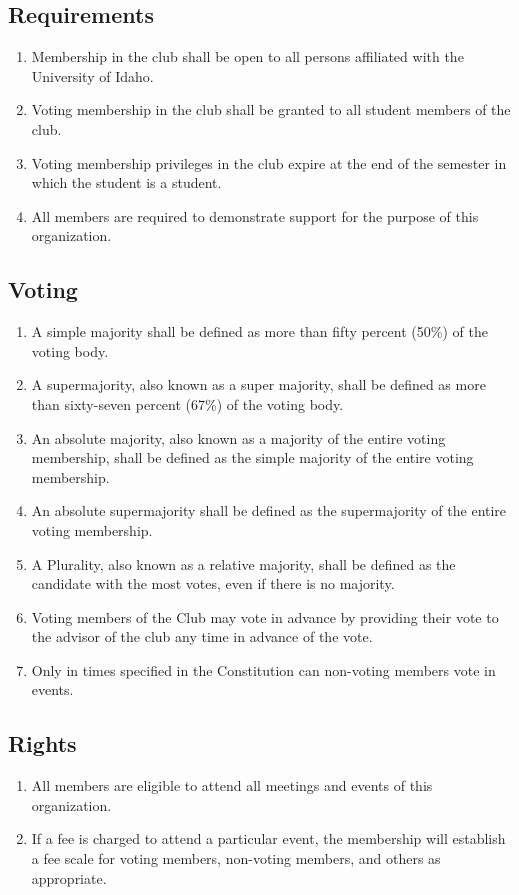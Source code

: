\documentclass[12pt]{scrartcl} %
\begin{document}
	\subsection{Requirements}
		\begin{enumerate}
			\item Membership in the club shall be open to all persons affiliated with the University of Idaho. 
			\item Voting membership in the club shall be granted to all student members of the club.
			\item Voting membership privileges in the club expire at the end of the semester in which the student is a student.  
			\item All members are required to demonstrate support for the purpose of this organization.
		\end{enumerate}
	\subsection{Voting}
		\begin{enumerate}
			\item A simple majority shall be defined as more than fifty percent (50\%) of the voting body.
			\item A supermajority, also known as a super majority, shall be defined as more than sixty-seven percent (67\%) of the voting body.
			\item An absolute majority, also known as a majority of the entire voting membership, shall be defined as the simple majority of the entire voting membership.
			\item An absolute supermajority shall be defined as the supermajority of the entire voting membership.
			\item A Plurality, also known as a relative majority, shall be defined as the candidate with the most votes, even if there is no majority.
			\item Voting members of the Club may vote in advance by providing their vote to the advisor of the club any time in advance of the vote.
			\item Only in times specified in the Constitution can non-voting members vote in events.

		\end{enumerate}	
	\subsection{Rights}
		\begin{enumerate}
			\item All members are eligible to attend all meetings and events of this organization.
			\item If a fee is charged to attend a particular event, the membership will establish a fee scale for voting members, non-voting members, and others as appropriate.
		\end{enumerate}
\end{document}
